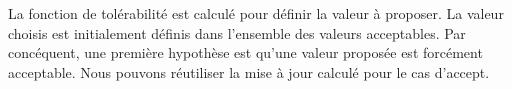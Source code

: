 \documentclass[runningheads,a4paper]{llncs}
\begin{document}
La fonction de tolérabilité est calculé pour définir la valeur à proposer. La valeur choisis est initialement définis dans l'ensemble des valeurs acceptables. Par concéquent, une première hypothèse est qu'une valeur proposée est forcément acceptable. Nous pouvons réutiliser la mise à jour calculé pour le cas d'accept.

	
\end{document}
